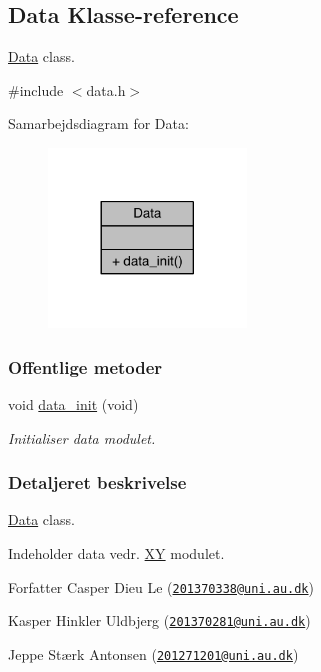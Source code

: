 \hypertarget{class_data}{}\subsection{Data Klasse-\/reference}
\label{class_data}


\hyperlink{class_data}{Data} class.  




{\ttfamily \#include $<$data.\+h$>$}



Samarbejdsdiagram for Data\+:
\nopagebreak
\begin{figure}[H]
\begin{center}
\leavevmode
\includegraphics[width=149pt]{da/d91/class_data__coll__graph}
\end{center}
\end{figure}
\subsubsection*{Offentlige metoder}
\begin{DoxyCompactItemize}
\item 
void \hyperlink{class_data_adf37c815716edf228a3cbb4564290275}{data\+\_\+init} (void)
\begin{DoxyCompactList}\small\item\em Initialiser data modulet. \end{DoxyCompactList}\end{DoxyCompactItemize}


\subsubsection{Detaljeret beskrivelse}
\hyperlink{class_data}{Data} class. 

Indeholder data vedr. \hyperlink{class_x_y}{XY} modulet. \begin{DoxyAuthor}{Forfatter}
Casper Dieu Le (\href{mailto:201370338@uni.au.dk}{\tt 201370338@uni.\+au.\+dk}) 

Kasper Hinkler Uldbjerg (\href{mailto:201370281@uni.au.dk}{\tt 201370281@uni.\+au.\+dk}) 

Jeppe Stærk Antonsen (\href{mailto:201271201@uni.au.dk}{\tt 201271201@uni.\+au.\+dk}) 
\end{DoxyAuthor}


